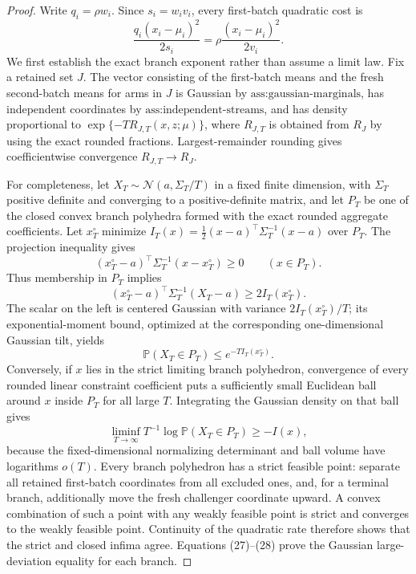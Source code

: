 \documentclass{article}
\begin{document}
\begin{proof}
Write \(q_i=\rho w_i\). Since \(s_i=w_iv_i\), every first-batch quadratic cost is
\[
 \frac{q_i(x_i-\mu_i)^2}{2s_i}=\rho\frac{(x_i-\mu_i)^2}{2v_i}. \tag{25}
\]
We first establish the exact branch exponent rather than assume a limit law. Fix a retained set \(J\). The vector consisting of the first-batch means and the fresh second-batch means for arms in \(J\) is Gaussian by \(\text{ass:gaussian-marginals}\), has independent coordinates by \(\text{ass:independent-streams}\), and has density proportional to \(\exp\{-T R_{J,T}(x,z;\mu)\}\), where \(R_{J,T}\) is obtained from \(R_J\) by using the exact rounded fractions. Largest-remainder rounding gives coefficientwise convergence \(R_{J,T}\to R_J\).

For completeness, let \(X_T\sim\mathcal N(a,\Sigma_T/T)\) in a fixed finite dimension, with \(\Sigma_T\) positive definite and converging to a positive-definite matrix, and let \(P_T\) be one of the closed convex branch polyhedra formed with the exact rounded aggregate coefficients. Let \(x_T^\circ\) minimize \(I_T(x)=\tfrac12(x-a)^\top\Sigma_T^{-1}(x-a)\) over \(P_T\). The projection inequality gives
\[
 (x_T^\circ-a)^\top\Sigma_T^{-1}(x-x_T^\circ)\ge0\qquad(x\in P_T). \tag{26}
\]
Thus membership in \(P_T\) implies
\[
 (x_T^\circ-a)^\top\Sigma_T^{-1}(X_T-a)\ge 2I_T(x_T^\circ).
\]
The scalar on the left is centered Gaussian with variance \(2I_T(x_T^\circ)/T\); its exponential-moment bound, optimized at the corresponding one-dimensional Gaussian tilt, yields
\[
 \mathbb P(X_T\in P_T)\le e^{-T I_T(x_T^\circ)}. \tag{27}
\]
Conversely, if \(x\) lies in the strict limiting branch polyhedron, convergence of every rounded linear constraint coefficient puts a sufficiently small Euclidean ball around \(x\) inside \(P_T\) for all large \(T\). Integrating the Gaussian density on that ball gives
\[
 \liminf_{T\to\infty}T^{-1}\log\mathbb P(X_T\in P_T)\ge-I(x), \tag{28}
\]
because the fixed-dimensional normalizing determinant and ball volume have logarithms \(o(T)\). Every branch polyhedron has a strict feasible point: separate all retained first-batch coordinates from all excluded ones, and, for a terminal branch, additionally move the fresh challenger coordinate upward. A convex combination of such a point with any weakly feasible point is strict and converges to the weakly feasible point. Continuity of the quadratic rate therefore shows that the strict and closed infima agree. Equations (27)--(28) prove the Gaussian large-deviation equality for each branch.


\end{proof}
\end{document}
